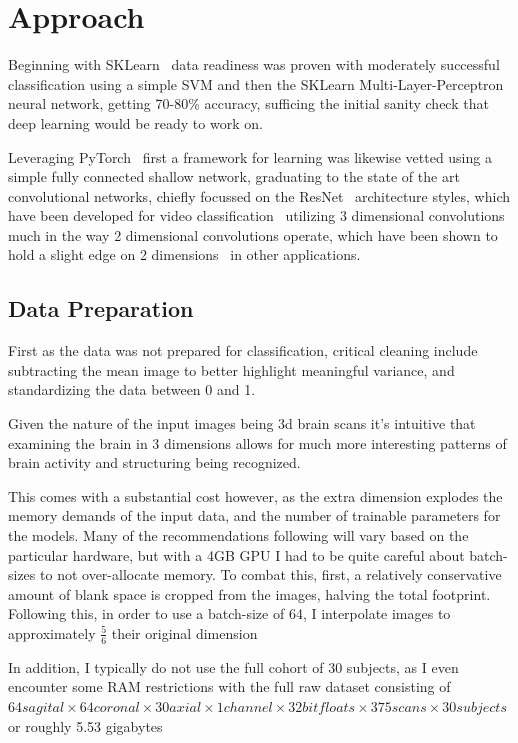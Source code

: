 \section{Approach}\label{sec:approach}

Beginning with SKLearn~\cite{scikit-learn} data readiness was proven with moderately successful classification using
a simple SVM and then the SKLearn Multi-Layer-Perceptron neural network, getting 70-80\% accuracy, sufficing the
initial sanity check that deep learning would be ready to work on.

Leveraging PyTorch~\cite{paszke2017automatic} first a framework for learning was likewise vetted using a simple fully
connected shallow network, graduating to the state of the art convolutional networks, chiefly focussed
on the ResNet~\cite{he2016deep} architecture styles, which have been developed for video classification~\cite{tran2018closer}
utilizing 3 dimensional convolutions much in the way 2 dimensional convolutions operate, which have
been shown to hold a slight edge on 2 dimensions~\cite{payan2015predicting} in other applications.


\subsection{Data Preparation}\label{subsec:data-preparation}

First as the data was not prepared for classification, critical cleaning include subtracting the mean image to better
highlight meaningful variance, and standardizing the data between 0 and 1.

Given the nature of the input images being 3d brain scans it's intuitive that examining the brain in 3 dimensions
allows for much more interesting patterns of brain activity and structuring being recognized.

This comes with a substantial cost however, as the extra dimension explodes the memory demands of the input data, and
the number of trainable parameters for the models.
Many of the recommendations following will vary based on the particular hardware, but with a 4GB GPU I had to be quite
careful about batch-sizes to not over-allocate memory.
To combat this, first, a relatively conservative amount of blank space is cropped from the images, halving the total footprint.
Following this, in order to use a batch-size of 64, I interpolate images to approximately $\frac{5}{6}$ their original dimension

In addition, I typically do not use the full cohort of 30 subjects, as I even encounter some RAM restrictions with the
full raw dataset consisting of
$64 sagital \times 64 coronal \times 30 axial \times 1 channel \times 32bit floats \times 375 scans \times 30 subjects$ or roughly 5.53 gigabytes


